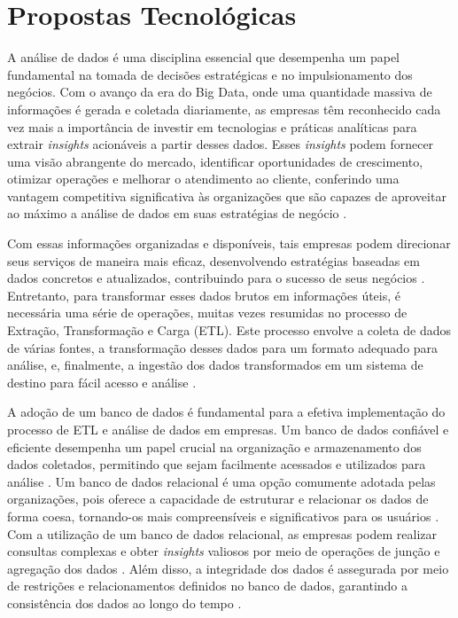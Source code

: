 \chapter{Propostas Tecnológicas}

A análise de dados é uma disciplina essencial que desempenha um papel fundamental na tomada de decisões estratégicas e no impulsionamento dos negócios. Com o avanço da era do Big Data, onde uma quantidade massiva de informações é gerada e coletada diariamente, as empresas têm reconhecido cada vez mais a importância de investir em tecnologias e práticas analíticas para extrair \textit{insights} acionáveis a partir desses dados. Esses \textit{insights} podem fornecer uma visão abrangente do mercado, identificar oportunidades de crescimento, otimizar operações e melhorar o atendimento ao cliente, conferindo uma vantagem competitiva significativa às organizações que são capazes de aproveitar ao máximo a análise de dados em suas estratégias de negócio \cite{mayer2013big, chen2012business, reddy2013data, watson2010current, white2012hadoop}.

Com essas informações organizadas e disponíveis, tais empresas podem direcionar seus serviços de maneira mais eficaz, desenvolvendo estratégias baseadas em dados concretos e atualizados, contribuindo para o sucesso de seus negócios \cite{chen2012business}.
Entretanto, para transformar esses dados brutos em informações úteis, é necessária uma série de operações, muitas vezes resumidas no processo de Extração, Transformação e Carga (ETL). Este processo envolve a coleta de dados de várias fontes, a transformação desses dados para um formato adequado para análise, e, finalmente, a ingestão dos dados transformados em um sistema de destino para fácil acesso e análise \cite{vassiliadis2002conceptual}.

A adoção de um banco de dados é fundamental para a efetiva implementação do processo de ETL e análise de dados em empresas. Um banco de dados confiável e eficiente desempenha um papel crucial na organização e armazenamento dos dados coletados, permitindo que sejam facilmente acessados e utilizados para análise \cite{elmasri2019fundamentals}. Um banco de dados relacional é uma opção comumente adotada pelas organizações, pois oferece a capacidade de estruturar e relacionar os dados de forma coesa, tornando-os mais compreensíveis e significativos para os usuários \cite{date2003introduction}. Com a utilização de um banco de dados relacional, as empresas podem realizar consultas complexas e obter \textit{insights} valiosos por meio de operações de junção e agregação dos dados \cite{connolly2014database}. Além disso, a integridade dos dados é assegurada por meio de restrições e relacionamentos definidos no banco de dados, garantindo a consistência dos dados ao longo do tempo \cite{silberschatz2019database}.


